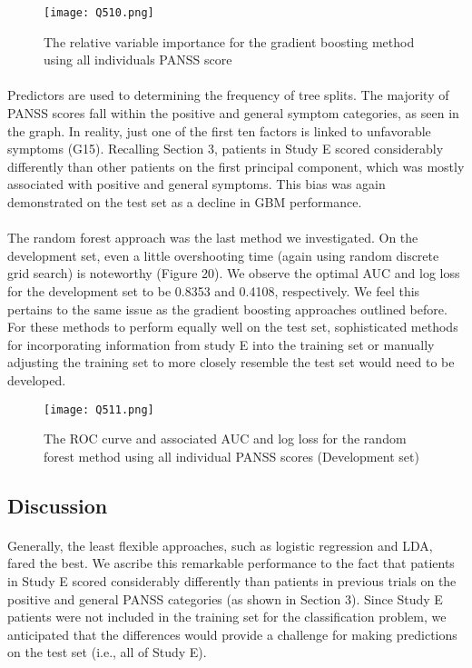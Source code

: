 \documentclass{article}
\begin{document}
\begin{figure}[H] 
\centering %
\texttt{[image: Q510.png]} 
\caption{The relative variable importance for the gradient boosting method using all individuals PANSS score}
\label{R} %
\end{figure}
\paragraph{}Predictors are used to determining the frequency of tree splits. The majority of PANSS scores fall within the positive and general symptom categories, as seen in the graph. In reality, just one of the first ten factors is linked to unfavorable symptoms (G15). Recalling Section 3, patients in Study E scored considerably differently than other patients on the first principal component, which was mostly associated with positive and general symptoms. This bias was again demonstrated on the test set as a decline in GBM performance.
\paragraph{}The random forest approach was the last method we investigated. On the development set, even a little overshooting time (again using random discrete grid search) is noteworthy (Figure 20). We observe the optimal AUC and log loss for the development set to be 0.8353 and 0.4108, respectively. We feel this pertains to the same issue as the gradient boosting approaches outlined before. For these methods to perform equally well on the test set, sophisticated methods for incorporating information from study E into the training set or manually adjusting the training set to more closely resemble the test set would need to be developed.

\begin{figure}[H] 
\centering %
\texttt{[image: Q511.png]} 
\caption{The ROC curve and associated AUC and log loss for the random forest method using all individual PANSS scores (Development set)}
\label{R} %
\end{figure}

\subsection{Discussion}
 	\paragraph{}Generally, the least flexible approaches, such as logistic regression and LDA, fared the best. We ascribe this remarkable performance to the fact that patients in Study E scored considerably differently than patients in previous trials on the positive and general PANSS categories (as shown in Section 3). Since Study E patients were not included in the training set for the classification problem, we anticipated that the differences would provide a challenge for making predictions on the test set (i.e., all of Study E).
\end{document}
